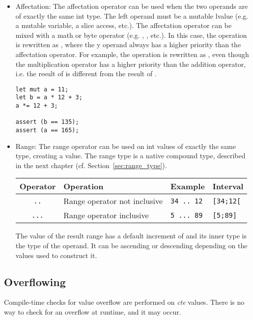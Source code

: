 \begin{itemize}
\item Affectation: The affectation operator \token{=} can be used when the two
  operands are of exactly the same int type. The left operand must be a mutable
  lvalue (e.g. a mutable variable, a slice access, etc.). The affectation
  operator can be mixed with a math or byte operator (e.g. \token{+=},
  \token{\&=}, etc.). In this case, the operation  is rewritten
  as , where the y operand always has a higher priority than
  the affectation operator. For example, the operation  is
  rewritten as , even though the multiplication
  operator has a higher priority than the addition operator, i.e. the result of
   is different from the result of .

  \begin{lstlisting}[style=coloredverbatim]
let mut a = 11;
let b = a * 12 + 3;
a *= 12 + 3;

assert (b == 135);
assert (a == 165);
  \end{lstlisting}

\item Range: The range operator can be used on int values of exactly the same
  type, creating a  value. The range type is a native compound
  type, described in the next chapter (cf. Section~\ref{sec:range_type}).

  \begin{center}
    \begin{adjustbox}{max width=1.0\linewidth}
      \begin{tabular}{|c|lll|}
        \hline
        Operator & Operation & Example & Interval\\[0pt]
        \hline
        \texttt{..} & Range operator not inclusive & \texttt{34 .. 12} & \texttt{[34;12[}\\[0pt]
            \texttt{...} & Range operator inclusive & \texttt{5 ... 89} & \texttt{[5;89]}\\[0pt]
            \hline
      \end{tabular}
    \end{adjustbox}
  \end{center}

The value of the result range has a default increment of  and its
inner type is the type of the operand. It can be ascending or descending
depending on the values used to construct it.

\end{itemize}

\subsection{Overflowing}
\label{sec:org0881da2}

Compile-time checks for value overflow are performed on \textit{cte} values.
There is no way to check for an overflow at runtime, and it may occur.

\vfill%
\pagebreak




